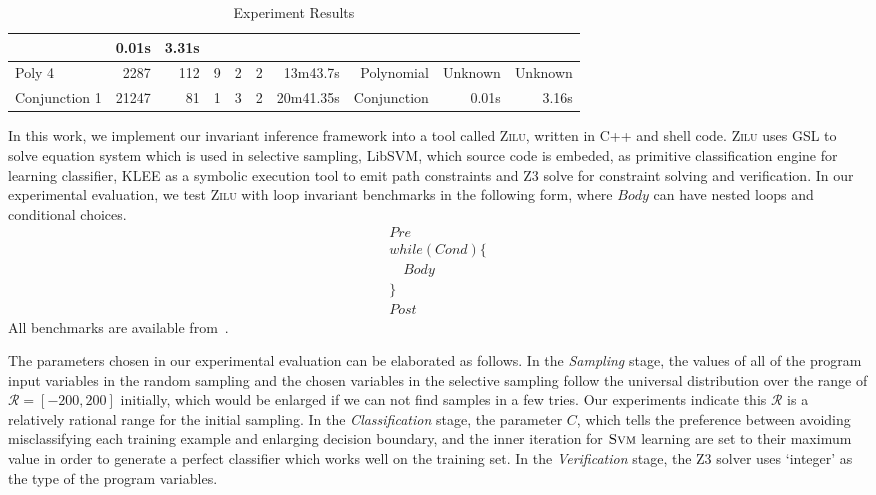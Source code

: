 \begin{table*}[t]
\begin{center}
\begin{center}
\begin{adjustbox}{max width=1\textwidth}
\begin{tabular}{l | r | r | r | r | r | r | r | r | r}
            & 0.01s & 3.31s 
            \\
        \hline
        Poly 4 
            & 2287 & 112 & 9
            & 2 & 2
            & 13m43.7s & Polynomial
            & Unknown & Unknown 
            \\
        \hline
        Conjunction 1
            & 21247 & 81 & 1 
            & 3 & 2 
            & 20m41.35s & Conjunction
            & 0.01s & 3.16s
            \\
        \hline
    \end{tabular}
    \end{adjustbox}
    \end{center}
    \end{center}
    \caption{Experiment Results}
    \label{tab:experiments}
\end{table*}

In this work, we implement our invariant inference framework into a tool called \textsc{Zilu}, 
written in C++ and shell code. 
\textsc{Zilu} uses GSL to solve equation system which is used in selective sampling, 
LibSVM, which source code is embeded, as primitive classification engine for learning classifier, 
KLEE as a symbolic execution tool to emit path constraints 
and Z3 solve for constraint solving and verification. 
In our experimental evaluation, 
we test \textsc{Zilu} with  loop invariant benchmarks 
in the following form, where $\mathit{Body}$ can have nested loops and conditional choices. 
\begin{align*}
&Pre&\\
&while (Cond) \{&\\
&  \quad Body &\\
&\} &\\
&Post &
\end{align*}
All benchmarks are available from~\cite{zilu}. 

The parameters chosen in our experimental evaluation can be elaborated as follows. 
In the \emph{Sampling} stage, 
the values of all of the program input variables in the random sampling 
and the chosen variables in the selective sampling 
follow the universal distribution over the range of $\mathcal{R} = [-200, 200]$ initially,
which would be enlarged if we can not find samples in a few tries.
Our experiments indicate this $\mathcal{R}$ is a relatively rational range for the initial sampling.
In the \emph{Classification} stage, 
the parameter $C$, 
which tells the preference between avoiding misclassifying each training example and enlarging decision boundary,
and the inner iteration 
for $\textsc{Svm}$ learning are set to their maximum value 
in order to generate a perfect classifier which works well on the training set. 
In the \emph{Verification} stage, 
the Z3 solver uses `integer' as the type of the program variables. 

